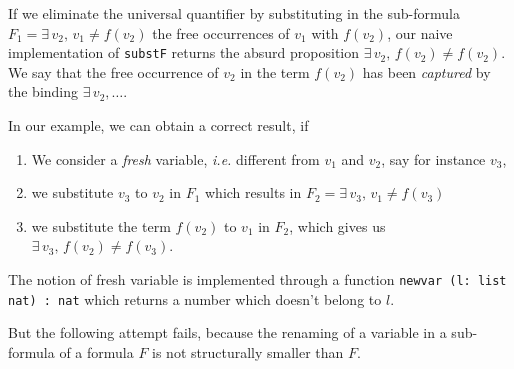 If we eliminate the universal quantifier by substituting in
the sub-formula $F_1=  \exists\,v_2,\,v_1\not=f(v_2)$ the free
occurrences of $v_1$ with $f(v_2)$, our naive implementation of
\texttt{substF} returns the absurd proposition $\exists\,v_2,\,f(v_2)\not=f(v_2)$. We  say that the free occurrence of $v_2$ in the term $f(v_2)$ has been \emph{captured} by the binding $\exists\,v_2,\dots$.


In our example, we can obtain a correct result, if
\begin{enumerate}
\item We consider a \emph{fresh} variable, \emph{i.e.}  different from $v_1$ and $v_2$, say for instance $v_3$,
\item we substitute $v_3$ to $v_2$ in $F_1$ which results in
   $F_2= \exists\,v_3,\,v_1\not=f(v_3)$
\item we substitute the term $f(v_2)$ to $v_1$ in $F_2$, which gives us 
  $\exists\,v_3,\,f(v_2)\not=f(v_3)$.
\end{enumerate}

The notion of fresh variable is implemented through a function
\texttt{newvar (l: list nat) : nat} which returns a number which doesn't belong to $l$.

But the following attempt fails, because the renaming of a  variable in a 
sub-formula of a formula $F$ is not structurally smaller than $F$.









